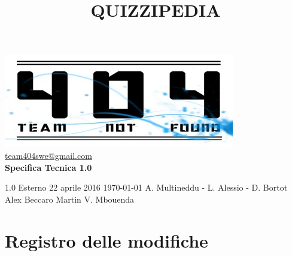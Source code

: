 \documentclass[a4paper,11pt]{article}
\title{\textbf{{\fontsize{8mm}{5mm}\selectfont QUIZZIPEDIA}}}
\date{}
\author{}
\begin{document}
	\maketitle
	\thispagestyle{empty}
	\begin{center}	
	\includegraphics{../team_not_found.jpg}\\
	\fontsize{5mm}{3mm}\url{team404swe@gmail.com}\\
	
	\vspace{50mm}
	\textbf{Specifica Tecnica 1.0}
	\end{center}
			{1.0} 							%
			{Esterno} 						%
			{22 aprile 2016} 				%
			{\today} 						%
			{A. Multineddu - L. Alessio - D. Bortot}	%
			{Alex Beccaro } 			%
			{Martin V. Mbouenda} 				%
	\newpage
	\thispagestyle{empty}
	\null  

	\newpage
	\newpage
	\fancyfoot[R]{\thepage}
	
	\hspace{30 mm}
	\section*{Registro delle modifiche}
	
	\beginregistro
	
\end{document}
